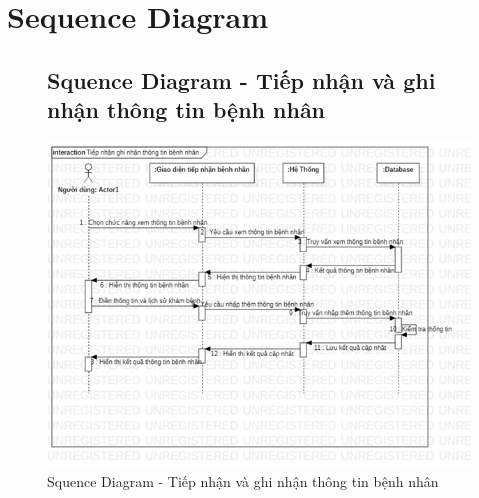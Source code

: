 \documentclass{report}
\begin{document}
\section{Sequence Diagram}
\begin{center}
	\begin{figure}[!htp]
		\subsection{Squence Diagram - Tiếp nhận và ghi nhận thông tin bệnh nhân}
		\begin{center}
			\includegraphics[scale=1]{Hinh/Sequence diagram Tiếp nhận và ghi nhận thông tin bệnh nhân.png}
		\end{center}
		\caption{Squence Diagram - Tiếp nhận và ghi nhận thông tin bệnh nhân}
	\end{figure}
\end{center}
\end{document}

